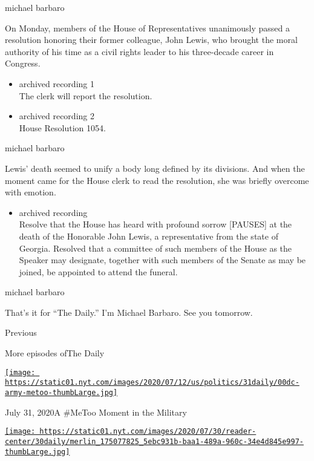 michael barbaro

On Monday, members of the House of Representatives unanimously passed a
resolution honoring their former colleague, John Lewis, who brought the
moral authority of his time as a civil rights leader to his three-decade
career in Congress.

\begin{itemize}
\item
  archived recording 1\\
  The clerk will report the resolution.
\item
  archived recording 2\\
  House Resolution 1054.
\end{itemize}

michael barbaro

Lewis' death seemed to unify a body long defined by its divisions. And
when the moment came for the House clerk to read the resolution, she was
briefly overcome with emotion.

\begin{itemize}
\tightlist
\item
  archived recording\\
  Resolve that the House has heard with profound sorrow {[}PAUSES{]} at
  the death of the Honorable John Lewis, a representative from the state
  of Georgia. Resolved that a committee of such members of the House as
  the Speaker may designate, together with such members of the Senate as
  may be joined, be appointed to attend the funeral.
\end{itemize}

michael barbaro

That's it for ``The Daily.'' I'm Michael Barbaro. See you tomorrow.

Previous

More episodes ofThe Daily

\href{https://www.nytimes.com/2020/07/31/podcasts/the-daily/vanessa-guillen-military-metoo.html?action=click\&module=audio-series-bar\&region=header\&pgtype=Article}{\texttt{[image: https://static01.nyt.com/images/2020/07/12/us/politics/31daily/00dc-army-metoo-thumbLarge.jpg]}}

July 31, 2020A \#MeToo Moment in the Military

\href{https://www.nytimes.com/2020/07/30/podcasts/the-daily/congress-facebook-amazon-google-apple.html?action=click\&module=audio-series-bar\&region=header\&pgtype=Article}{\texttt{[image: https://static01.nyt.com/images/2020/07/30/reader-center/30daily/merlin\_175077825\_5ebc931b-baa1-489a-960c-34e4d845e997-thumbLarge.jpg]}}

